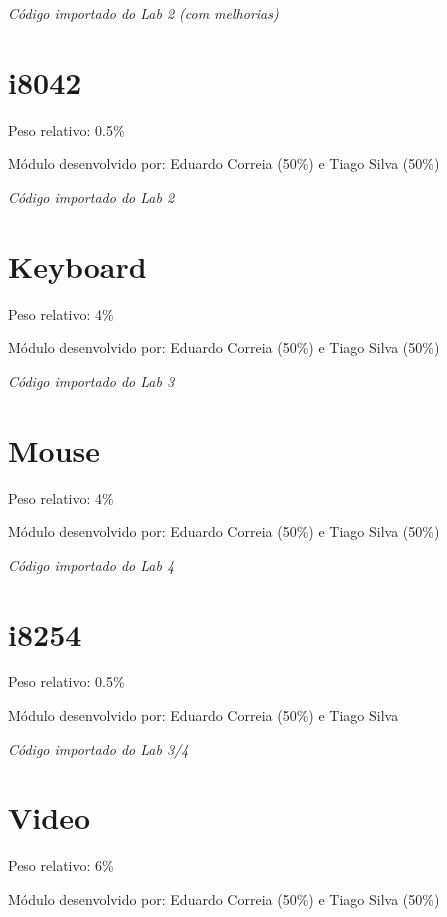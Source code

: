 \documentclass{report}
\begin{document}
\textit{Código importado do Lab 2 (com melhorias)}\footnotemark[\value{footnote}]

\section{i8042}

Peso relativo: 0.5\%

Módulo desenvolvido por: Eduardo Correia (50\%) e Tiago Silva (50\%)
\newline

\textit{Código importado do Lab 2}\footnotemark

\section{Keyboard}

Peso relativo: 4\%

Módulo desenvolvido por: Eduardo Correia (50\%) e Tiago Silva (50\%)
\newline

\textit{Código importado do Lab 3}\footnotemark[\value{footnote}]

\section{Mouse}

Peso relativo: 4\%

Módulo desenvolvido por: Eduardo Correia (50\%) e Tiago Silva (50\%)
\newline

\textit{Código importado do Lab 4}\footnotemark[\value{footnote}]

\section{i8254}

Peso relativo: 0.5\%

Módulo desenvolvido por: Eduardo Correia (50\%) e Tiago Silva
\newline

\textit{Código importado do Lab 3/4}\footnotemark[\value{footnote}]

\section{Video}

Peso relativo: 6\%

Módulo desenvolvido por: Eduardo Correia (50\%) e Tiago Silva (50\%)
\newline
\end{document}
